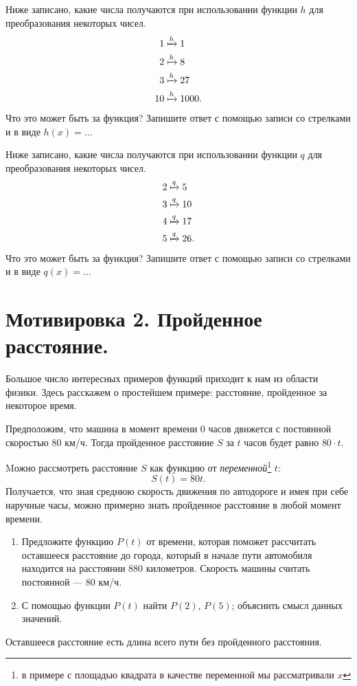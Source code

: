 \documentclass[11pt,fleqn]{book} %
\begin{document}
\begin{exercise}
Ниже записано, какие числа получаются при использовании функции $h$ для преобразования некоторых чисел.
\begin{align*}
1 &\xmapsto{h} 1 \\
2 &\xmapsto{h} 8 \\
3 &\xmapsto{h} 27 \\
10 &\xmapsto{h} 1000.
\end{align*}
Что это может быть за функция? Запишите ответ с помощью записи со стрелками и в виде $h(x) = \ldots$
\end{exercise}

\begin{exercise}
Ниже записано, какие числа получаются при использовании функции $q$ для преобразования некоторых чисел.
\begin{align*}
2 &\xmapsto{q} 5 \\
3 &\xmapsto{q} 10 \\
4 &\xmapsto{q} 17 \\
5 &\xmapsto{q} 26.
\end{align*}
Что это может быть за функция? Запишите ответ с помощью записи со стрелками и в виде $q(x) = \ldots$
\end{exercise}

\section{Мотивировка 2. Пройденное расстояние.}

Большое число интересных примеров функций приходит к нам из области физики. Здесь расскажем о простейшем примере: расстояние, пройденное за некоторое время.

Предположим, что машина в момент времени $0$ часов движется с постоянной скоростью $80$ км/ч. Тогда пройденное расстояние $S$ за $t$ часов будет равно $80\cdot t$. 

Mожно рассмотреть расстояние $S$ как функцию от \textit{переменной}\footnote{в примере с площадью квадрата в качестве переменной мы рассматривали $x$} $t$:
$$ S(t) = 80t. $$
Получается, что зная среднюю скорость движения по автодороге и имея при себе наручные часы, можно примерно знать пройденное расстояние в любой момент времени.

\begin{exercise}
\begin{enumerate}
\item Предложите функцию $P(t)$ от времени, которая поможет рассчитать оставшееся расстояние до города, который в начале пути автомобиля находится на расстоянии $880$ километров. Скорость машины считать постоянной --- $80$ км/ч.
\item С помощью функции $P(t)$ найти $P(2)$, $P(5)$; объяснить смысл данных значений.
\end{enumerate}


Оставшееся расстояние есть длина всего пути без пройденного расстояния.

\end{exercise}
\end{document}
